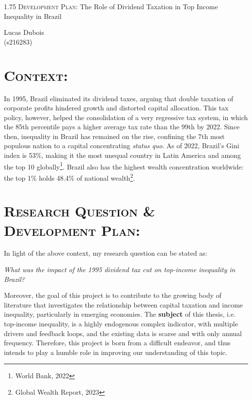 \documentclass[11pt,a4paper]{article}
\begin{document}
\begin{center}
    \begin{spacing}{1.75}
        {\huge \textsc{Development Plan}: The Role of Dividend Taxation in Top Income Inequality in Brazil}
        \vspace{0.25cm}
    \end{spacing}
    \large{Lucas Dubois}\\
    (s216283)
\end{center}
\section{\textsc{Context:}}
In 1995, Brazil eliminated its dividend taxes, arguing that double taxation of corporate profits hindered growth and distorted capital allocation.
This tax policy, however, helped the consolidation of a very regressive tax system, in which the 85th percentile pays a higher average tax rate than the 99th by 2022. 
Since then, inequality in Brazil has remained on the rise, confining the 7th most populous nation to a capital concentrating \textit{status quo}. 
As of 2022, Brazil's Gini index is 53\%, making it the most unequal country in Latin America and among the top 10 globally\footnote{World Bank, 2022}.
Brazil also has the highest wealth concentration worldwide: the top 1\% holds 48.4\% of national wealth\footnote{Global Wealth Report, 2023}.

\section{\textsc{Research Question \& Development Plan:}}

In light of the above context, my research question can be stated as:
\begin{center}
    \textit{What was the impact of the 1995 dividend tax cut on top-income inequality in Brazil?}
\end{center}

Moreover, the goal of this project is to contribute to the growing body of literature that investigates the relationship between capital taxation and income inequality, particularly in emerging economies.
The \textbf{subject} of this thesis, i.e. top-income inequality, is a highly endogenous complex indicator, with multiple drivers and feedback loops, and the existing data is scarse and with only annual frequency.
Therefore, this project is born from a difficult endeavor, and thus intends to play a humble role in improving our understanding of this topic.
\end{document}
